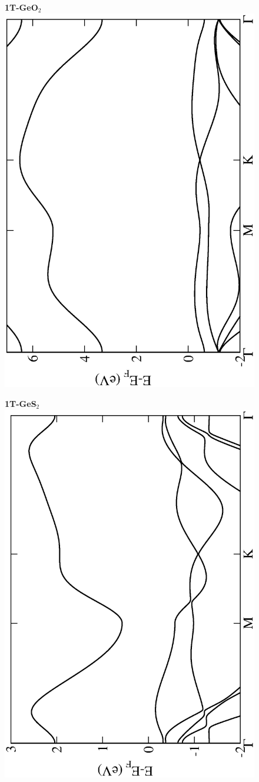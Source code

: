 \begin{figure}[htbp]
\centering
{\bfseries \sffamily 1T-GeO$_{2}$}\\
\includegraphics[width=0.45\linewidth, angle=-90, trim={2.9cm, 0cm, 2cm, 0cm}, clip]{img/SI_figs/BS/1T-GeO2.eps}
\end{figure}

\begin{figure}[htbp]
\centering
{\bfseries \sffamily 1T-GeS$_{2}$}\\
\includegraphics[width=0.45\linewidth, angle=-90, trim={2.9cm, 0cm, 2cm, 0cm}, clip]{img/SI_figs/BS/1T-GeS2.eps}
\end{figure}

